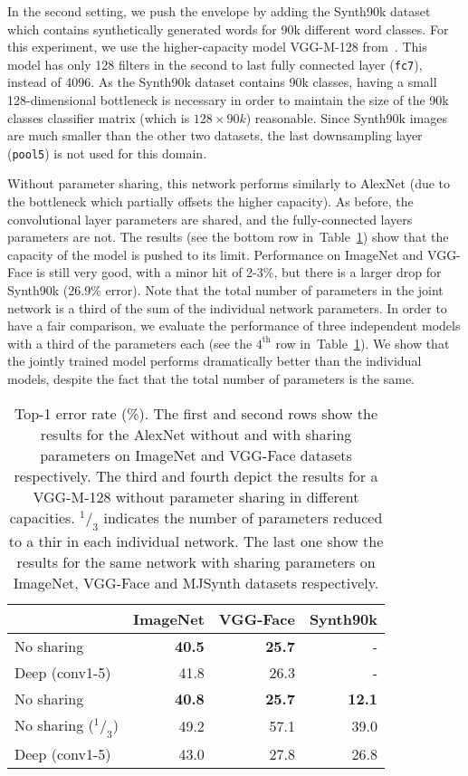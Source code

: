 \documentclass[10pt,twocolumn,letterpaper]{article}
\begin{document}
In the second setting, we push the envelope by adding the Synth90k dataset which contains synthetically generated words for 90k different word classes. For this experiment, we use the higher-capacity model VGG-M-128 from~\cite{chatfield14return}. This model has only 128 filters in the second to last fully connected layer (\texttt{fc7}), instead of 4096. As the Synth90k dataset contains 90k classes, having a small 128-dimensional bottleneck is necessary in order to maintain the size  of the 90k classes classifier matrix (which is $128 \times 90k$) reasonable. Since Synth90k images are much smaller than the other two datasets, the last downsampling layer ({\tt pool5}) is not used for this domain.

Without parameter sharing, this network performs similarly to AlexNet (due to the bottleneck which partially offsets the higher capacity). As before, the convolutional layer parameters are shared, and the fully-connected layers parameters are not. The results (see the bottom row in~Table~\ref{tab:largedatasets}) show that the capacity of the model is pushed to its limit. Performance on ImageNet and VGG-Face is still very good, with a minor hit of 2-3\%, but there is a larger drop for Synth90k ($26.9\%$ error). Note that the total number of parameters in the joint network is a third of the sum of the individual network parameters. In order to have a fair comparison, we evaluate the performance of three independent models with a third of the parameters each (see the $4^\text{th}$ row in~Table~\ref{tab:largedatasets}). We show that the jointly trained model performs dramatically better than the individual models, despite the fact that the total number of parameters is the same.


\begin{table}
  \centering
  \begin{tabular}{lrrr}
	  \toprule
    & ImageNet & VGG-Face & Synth90k\\
    \midrule
  No sharing & \bf{40.5} & \bf{25.7} & -\\
  Deep (conv1-5) & 41.8 & 26.3 & -\\
  \midrule
  No sharing & \bf{40.8} & \bf{25.7} & \bf{12.1}\\
  No sharing ($^1/_3$) & 49.2 & 57.1 & 39.0\\
  Deep (conv1-5) & 43.0 & 27.8 & 26.8\\
  \bottomrule
  \end{tabular}
  \caption{Top-1 error rate (\%). The first and second rows show the results for the AlexNet without and with sharing parameters on ImageNet and VGG-Face datasets respectively. The third and fourth depict the results for a VGG-M-128 without parameter sharing in different capacities. $^1/_3$ indicates the number of parameters reduced to a thir in each individual network. The last one show the results for the same network with sharing parameters on ImageNet, VGG-Face and MJSynth datasets respectively. }
  \label{tab:largedatasets}
\end{table} 
\end{document}

